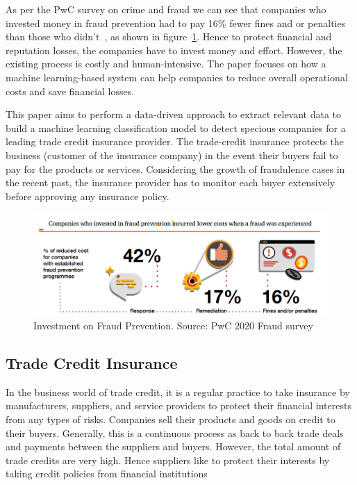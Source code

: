 

As per the PwC survey on crime and fraud we can see that companies who invested money in fraud prevention had to pay 16\% fewer fines and\/ or penalties than those who didn't~, as shown in figure~\ref{fig:fraud_preven}. Hence to protect financial and reputation losses, the companies have to invest money and effort. However, the existing process is costly and human-intensive. The paper focuses on how a machine learning-based system can help companies to reduce overall operational costs and save financial losses.

This paper aims to perform a data-driven approach to extract relevant data to build a machine learning classification model to detect specious companies for a leading trade credit insurance provider. The trade-credit insurance protects the business (customer of the insurance company) in the event their buyers fail to pay for the products or services. Considering the growth of fraudulence cases in the recent past, the insurance provider has to monitor each buyer extensively before approving any insurance policy. 

\begin{figure}[htp]
    \centering
    \includegraphics[width=\linewidth]{figures/prevent_fraud.PNG}
    \caption{Investment on Fraud Prevention. Source: PwC 2020 Fraud survey~\cite{PwC.Crime.Survey} }
    \label{fig:fraud_preven}
\end{figure}



\subsection{Trade Credit Insurance}\label{subsec:trade-credit-insurance}
In the business world of trade credit, it is a regular practice to take insurance by manufacturers, suppliers, and service providers to protect their financial interests from any types of risks. Companies sell their products and goods on credit to their buyers. Generally, this is a continuous process as back to back trade deals and payments between the suppliers and buyers. However, the total amount of trade credits are very high. Hence suppliers like to protect their interests by taking credit policies from financial institutions 


